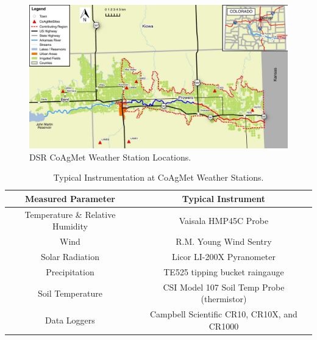 \begin{linenumbers}
	\begin{landscape}
	\begin{figure}[htbp]
		\includegraphics[scale=1]{Figures/Map/DSRCoAgMet}
		\caption[DSR CoAgMet Weather Station Locations.]{DSR CoAgMet Weather Station Locations.}
		\label{map:DSRCoAgMetLocations}	
	\end{figure}
	\end{landscape}
 
\begin{table}[htbp]
\centering
\caption[Typical Instrumentation at CoAgMet Weather Stations.]{Typical Instrumentation at CoAgMet Weather Stations.}
\label{tab:CoAgMetInstruments}
\begin{tabular}{c c}
	\toprule
	       Measured Parameter        & Typical Instrument                          \\ \toprule
	Temperature \& Relative Humidity & Vaisala HMP45C Probe                        \\
	              Wind               & R.M. Young Wind Sentry                      \\
	        Solar Radiation          & Licor LI-200X Pyranometer                   \\
	         Precipitation           & TE525 tipping bucket raingauge              \\
	        Soil Temperature         & CSI Model 107 Soil Temp Probe (thermistor)  \\
	          Data Loggers           & Campbell Scientific CR10, CR10X, and CR1000 \\ \bottomrule
\end{tabular}
\end{table}


\end{linenumbers}
